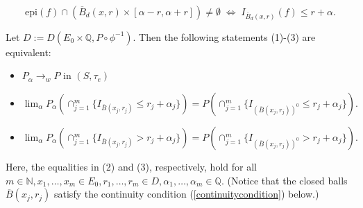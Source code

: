 \documentclass[10pt,a4paper]{amsart}
\begin{document}
\begin{equation} \label{epi1}
 \text{epi}(f) \cap (\overline{B}_d(x,r) \times [\alpha-r,\alpha+r]) \neq \emptyset \; \Leftrightarrow \; I_{\overline{B}_d(x,r)}(f) \le r+\alpha.
\end{equation}

\begin{theorem} \label{sufficient} Let $D:=D(E_0 \times \mathbb{Q},P \circ \phi^{-1})$. Then the following statements (1)-(3) are equivalent:
\begin{itemize}
\item[(1)] $P_\alpha \rightarrow_w P$ in $(S,\tau_e)$
\item[(2)] $\lim_\alpha P_\alpha(\cap_{j=1}^m \{I_{\overline{B}(x_j,r_j)} \le r_j+\alpha_j\}) = P(\cap_{j=1}^m \{I_{(\overline{B}(x_j,r_j))^0} \le r_j+ \alpha_j\}).$
\item[(3)] $\lim_\alpha P_\alpha(\cap_{j=1}^m \{I_{\overline{B}(x_j,r_j)} > r_j+\alpha_j\}) = P(\cap_{j=1}^m \{I_{(\overline{B}(x_j,r_j))^0} > r_j+ \alpha_j\}).$
\end{itemize}
Here, the equalities in (2) and (3), respectively, hold for all
$m \in \mathbb{N}, x_1,\ldots,x_m \in E_0, r_1,\ldots,r_m \in D, \alpha_1,\ldots,\alpha_m \in \mathbb{Q}.$ (Notice that the closed balls
$\overline{B}(x_j,r_j)$ satisfy the continuity condition (\ref{continuitycondition}) below.)
\end{theorem}
\end{document}
